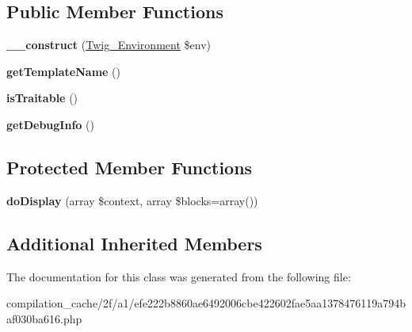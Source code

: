 \subsection*{Public Member Functions}
\begin{DoxyCompactItemize}
\item 
\hypertarget{class_____twig_template__2fa1efe222b8860ae6492006cbe422602fae5aa1378476119a794baf030ba616_a4f8326243132c1450a81e0a817aa1be7}{}{\bfseries \+\_\+\+\_\+construct} (\hyperlink{class_twig___environment}{Twig\+\_\+\+Environment} \$env)\label{class_____twig_template__2fa1efe222b8860ae6492006cbe422602fae5aa1378476119a794baf030ba616_a4f8326243132c1450a81e0a817aa1be7}

\item 
\hypertarget{class_____twig_template__2fa1efe222b8860ae6492006cbe422602fae5aa1378476119a794baf030ba616_a621a3ccd148ed8b9e937da6959c98f39}{}{\bfseries get\+Template\+Name} ()\label{class_____twig_template__2fa1efe222b8860ae6492006cbe422602fae5aa1378476119a794baf030ba616_a621a3ccd148ed8b9e937da6959c98f39}

\item 
\hypertarget{class_____twig_template__2fa1efe222b8860ae6492006cbe422602fae5aa1378476119a794baf030ba616_aa9eb89be270f6afc256ef5e272b78a63}{}{\bfseries is\+Traitable} ()\label{class_____twig_template__2fa1efe222b8860ae6492006cbe422602fae5aa1378476119a794baf030ba616_aa9eb89be270f6afc256ef5e272b78a63}

\item 
\hypertarget{class_____twig_template__2fa1efe222b8860ae6492006cbe422602fae5aa1378476119a794baf030ba616_abd0ecb0136f4228db2bd963bfc1e20d7}{}{\bfseries get\+Debug\+Info} ()\label{class_____twig_template__2fa1efe222b8860ae6492006cbe422602fae5aa1378476119a794baf030ba616_abd0ecb0136f4228db2bd963bfc1e20d7}

\end{DoxyCompactItemize}
\subsection*{Protected Member Functions}
\begin{DoxyCompactItemize}
\item 
\hypertarget{class_____twig_template__2fa1efe222b8860ae6492006cbe422602fae5aa1378476119a794baf030ba616_adb62b7c226e07d30f836ed16158d924f}{}{\bfseries do\+Display} (array \$context, array \$blocks=array())\label{class_____twig_template__2fa1efe222b8860ae6492006cbe422602fae5aa1378476119a794baf030ba616_adb62b7c226e07d30f836ed16158d924f}

\end{DoxyCompactItemize}
\subsection*{Additional Inherited Members}


The documentation for this class was generated from the following file\+:\begin{DoxyCompactItemize}
\item 
compilation\+\_\+cache/2f/a1/efe222b8860ae6492006cbe422602fae5aa1378476119a794baf030ba616.\+php\end{DoxyCompactItemize}
